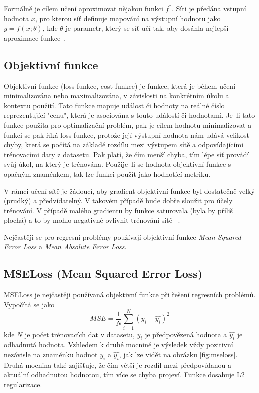 Formálně je cílem učení aproximovat nějakou funkci $f^\ast$. Síti je předána vstupní hodnota $x$, pro kterou síť definuje mapování na výstupní hodnotu jako $y = f(x; \theta)$, kde $\theta$ je parametr, který se síť učí tak, aby dosáhla nejlepší aproximace funkce~\cite[p.~163]{mitdeeplearning}.


\subsection{Objektivní funkce}
Objektivní funkce (loss funkce, cost funkce) je funkce, která je během učení minimalizována nebo maximalizována, v závislosti na konkrétním úkolu a kontextu použití. Tato funkce mapuje událost či hodnoty na reálné číslo reprezentující  "cenu", která je asociována s touto událostí či hodnotami. Je--li tato funkce použita pro optimalizační problém, pak je cílem hodnotu minimalizovat a funkci se pak říká loss funkce, protože její výstupní hodnota nám udává velikost chyby, která se počítá na základě rozdílu mezi výstupem sítě a odpovídajícími trénovacími daty z datasetu. Pak platí, že čím menší chyba, tím lépe síť provádí svůj úkol, na který je trénována. Použije--li se hodnota objektivní funkce s opačným znaménkem, tak lze funkci použít jako hodnotící metriku.

V rámci učení sítě je žádoucí, aby gradient objektivní funkce byl dostatečně velký (prudký) a předvídatelný. V takovém případě bude dobře sloužit pro účely trénování. V případě malého gradientu by funkce saturovala (byla by příliš plochá) a to by mohlo negativně ovlivnit trénování sítě~ \cite{mitdeeplearning}. 

Nejčastěji se pro regresní problémy používají objektivní funkce \textit{Mean Squared Error Loss} a \textit{Mean Absolute Error Loss}.


\subsection*{MSELoss (Mean Squared Error Loss)}
MSELoss je nejčastěji používaná objektivní funkce při řešení regresních problémů. Vypočítá se jako
\begin{equation}
  MSE = \frac{1}{N}\sum_{i=1}^N(y_i - \hat{y_i})^2
\end{equation}
kde $N$ je počet trénovacích dat v datasetu, $y_i$ je předpovězená hodnota a $\hat{y_i}$ je odhadnutá hodnota. Vzhledem k druhé mocnině je výsledek vždy pozitivní nezávisle na znaménku hodnot $y_i$ a $\hat{y_i}$, jak lze vidět na obrázku \ref{fig:mseloss}. Druhá mocnina také zajišťuje, že čím větší je rozdíl mezi předpovídanou a aktuální odhadnutou hodnotou, tím více se chyba projeví. Funkce dosahuje L2 regularizace.

